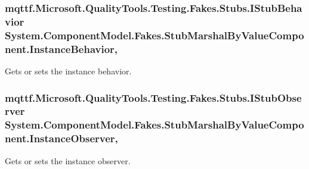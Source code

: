\hypertarget{class_system_1_1_component_model_1_1_fakes_1_1_stub_marshal_by_value_component_adcba1fa47a624240661bac16dbcb83d2}{
\subsubsection[{Instance\-Behavior}]{\setlength{\rightskip}{0pt plus 5cm}mqttf.\-Microsoft.\-Quality\-Tools.\-Testing.\-Fakes.\-Stubs.\-I\-Stub\-Behavior System.\-Component\-Model.\-Fakes.\-Stub\-Marshal\-By\-Value\-Component.\-Instance\-Behavior\hspace{0.3cm}{\ttfamily [get]}, {\ttfamily [set]}}}\label{class_system_1_1_component_model_1_1_fakes_1_1_stub_marshal_by_value_component_adcba1fa47a624240661bac16dbcb83d2}


Gets or sets the instance behavior.

\hypertarget{class_system_1_1_component_model_1_1_fakes_1_1_stub_marshal_by_value_component_a04fee152dcccedc7d5f9d87a811a3756}{
\subsubsection[{Instance\-Observer}]{\setlength{\rightskip}{0pt plus 5cm}mqttf.\-Microsoft.\-Quality\-Tools.\-Testing.\-Fakes.\-Stubs.\-I\-Stub\-Observer System.\-Component\-Model.\-Fakes.\-Stub\-Marshal\-By\-Value\-Component.\-Instance\-Observer\hspace{0.3cm}{\ttfamily [get]}, {\ttfamily [set]}}}\label{class_system_1_1_component_model_1_1_fakes_1_1_stub_marshal_by_value_component_a04fee152dcccedc7d5f9d87a811a3756}


Gets or sets the instance observer.

